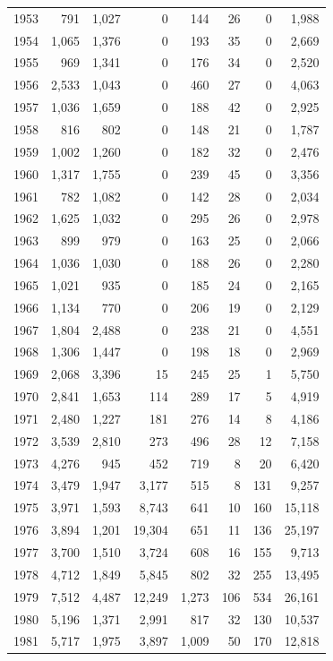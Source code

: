 \documentclass[
  english,
]{article}
\begin{document}
\begin{longtable}[t]{lrrrrrrr}
1953 & 791 & 1,027 & 0 & 144 & 26 & 0 & 1,988\\
1954 & 1,065 & 1,376 & 0 & 193 & 35 & 0 & 2,669\\
1955 & 969 & 1,341 & 0 & 176 & 34 & 0 & 2,520\\
1956 & 2,533 & 1,043 & 0 & 460 & 27 & 0 & 4,063\\
1957 & 1,036 & 1,659 & 0 & 188 & 42 & 0 & 2,925\\
1958 & 816 & 802 & 0 & 148 & 21 & 0 & 1,787\\
1959 & 1,002 & 1,260 & 0 & 182 & 32 & 0 & 2,476\\
1960 & 1,317 & 1,755 & 0 & 239 & 45 & 0 & 3,356\\
1961 & 782 & 1,082 & 0 & 142 & 28 & 0 & 2,034\\
1962 & 1,625 & 1,032 & 0 & 295 & 26 & 0 & 2,978\\
1963 & 899 & 979 & 0 & 163 & 25 & 0 & 2,066\\
1964 & 1,036 & 1,030 & 0 & 188 & 26 & 0 & 2,280\\
1965 & 1,021 & 935 & 0 & 185 & 24 & 0 & 2,165\\
1966 & 1,134 & 770 & 0 & 206 & 19 & 0 & 2,129\\
1967 & 1,804 & 2,488 & 0 & 238 & 21 & 0 & 4,551\\
1968 & 1,306 & 1,447 & 0 & 198 & 18 & 0 & 2,969\\
1969 & 2,068 & 3,396 & 15 & 245 & 25 & 1 & 5,750\\
1970 & 2,841 & 1,653 & 114 & 289 & 17 & 5 & 4,919\\
1971 & 2,480 & 1,227 & 181 & 276 & 14 & 8 & 4,186\\
1972 & 3,539 & 2,810 & 273 & 496 & 28 & 12 & 7,158\\
1973 & 4,276 & 945 & 452 & 719 & 8 & 20 & 6,420\\
1974 & 3,479 & 1,947 & 3,177 & 515 & 8 & 131 & 9,257\\
1975 & 3,971 & 1,593 & 8,743 & 641 & 10 & 160 & 15,118\\
1976 & 3,894 & 1,201 & 19,304 & 651 & 11 & 136 & 25,197\\
1977 & 3,700 & 1,510 & 3,724 & 608 & 16 & 155 & 9,713\\
1978 & 4,712 & 1,849 & 5,845 & 802 & 32 & 255 & 13,495\\
1979 & 7,512 & 4,487 & 12,249 & 1,273 & 106 & 534 & 26,161\\
1980 & 5,196 & 1,371 & 2,991 & 817 & 32 & 130 & 10,537\\
1981 & 5,717 & 1,975 & 3,897 & 1,009 & 50 & 170 & 12,818\\

\end{longtable}
\end{document}
